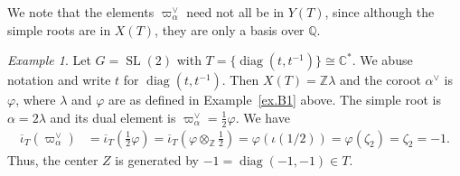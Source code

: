 \documentclass[reqno,11pt]{amsart}
\theoremstyle{remark}
\theoremstyle{remark}
\newtheorem{example}[Thm]{Example}
\theoremstyle{definition}
\theoremstyle{definition}
\theoremstyle{definition}
\numberwithin{equation}{section}
\newcommand{\C}{\mathbb{C}}           %
\newcommand{\Z}{\mathbb{ Z}}           %
\newcommand{\QQ}{\mathbb{ Q}}        %
\newcommand{\diag}{\operatorname{diag}}
\newcommand{\SL}{\operatorname{SL}}
\newcommand{\ga}{\alpha}
\def\ibarT{\overline{\iota}_T}
\begin{document}
We note that the elements  $\varpi^{\vee}_{\ga}$ need not all be in $Y(T)$, since although the simple roots are in $X(T)$, they are only a basis over $\QQ$. 

\begin{example}
Let $G = \SL(2)$ with $T = \{ \diag(t, t^{-1}) \} \cong \C^*$.  We abuse notation and write $t$ for $\diag(t, t^{-1})$.  Then $X(T) = \Z \lambda$ and the coroot $\ga^{\vee}$ is $\varphi$, where $\lambda$ and  $\varphi$ are as defined in Example~\ref{ex.B1} above.
The simple root is $\ga = 2 \lambda$ and its dual element is $ \varpi^{\vee}_{\ga} = \frac{1}{2} \varphi$.  We have
\begin{align*}
\ibarT(\varpi^{\vee}_{\ga} )  & = \ibarT\left(\frac{1}{2} \varphi \right) =  \ibarT\left(\varphi \otimes_{\Z} \frac{1}{2}\right) = \varphi(\iota(1/2)) = \varphi(\zeta_2) = \zeta_2 = -1.
\end{align*}
Thus, the center $Z$ is generated by $-1 = \diag(-1, -1) \in T$.
\end{example}
\end{document}
